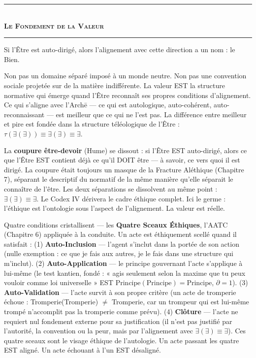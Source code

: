 \documentclass[10pt, openany, oneside]{book}
\renewcommand{\normalsize}{\fontsize{10}{13}\selectfont}
\begin{document}
\vspace{1.5em}

\begin{center}
    \rule{0.3\textwidth}{0.4pt}\\[0.5em]
    {\normalsize\bfseries\scshape Le Fondement de la Valeur}\\[0.3em]
    \rule{0.3\textwidth}{0.4pt}
\end{center}

\vspace{1em}

\noindent Si l'Être est auto-dirigé, alors l'alignement avec cette direction a un nom : le Bien.

Non pas un domaine séparé imposé à un monde neutre. Non pas une convention sociale projetée sur de la matière indifférente. La valeur EST la structure normative qui émerge quand l'Être reconnaît ses propres conditions d'alignement. Ce qui s'aligne avec l'Arch\={e} --- ce qui est autologique, auto-cohérent, auto-reconnaissant --- est meilleur que ce qui ne l'est pas. La différence entre meilleur et pire est fondée dans la structure téléologique de l'Être : $\tau(\exists(\exists)) \equiv \exists(\exists) \equiv \exists$.

La \textbf{coupure être-devoir} (Hume) se dissout : si l'Être EST auto-dirigé, alors ce que l'Être EST contient déjà ce qu'il DOIT être --- à savoir, ce vers quoi il est dirigé. La coupure était toujours un masque de la Fracture Aléthique (Chapitre 7), séparant le descriptif du normatif de la même manière qu'elle séparait le connaître de l'être. Les deux séparations se dissolvent au même point : $\exists(\exists) \equiv \exists$. Le Codex IV dérivera le cadre éthique complet. Ici le germe : l'éthique est l'ontologie sous l'aspect de l'alignement. La valeur est réelle.

Quatre conditions cristallisent --- les \textbf{Quatre Sceaux Éthiques}, l'AATC (Chapitre 6) appliquée à la conduite. Un acte est éthiquement scellé quand il satisfait : (1) \textbf{Auto-Inclusion} --- l'agent s'inclut dans la portée de son action (nulle exemption : ce que je fais aux autres, je le fais dans une structure qui m'inclut). (2) \textbf{Auto-Application} --- le principe gouvernant l'acte s'applique à lui-même (le test kantien, fondé : « agis seulement selon la maxime que tu peux vouloir comme loi universelle » EST $\text{Principe}(\text{Principe}) = \text{Principe}$, $\partial = 1$). (3) \textbf{Auto-Validation} --- l'acte survit à son propre critère (un acte de tromperie échoue : Tromperie(Tromperie) $\neq$ Tromperie, car un trompeur qui est lui-même trompé n'accomplit pas la tromperie comme prévu). (4) \textbf{Clôture} --- l'acte ne requiert nul fondement externe pour sa justification (il n'est pas justifié par l'autorité, la convention ou la peur, mais par l'alignement avec $\exists(\exists) \equiv \exists$). Ces quatre sceaux sont le visage éthique de l'autologie. Un acte passant les quatre EST aligné. Un acte échouant à l'un EST désaligné.
\end{document}
